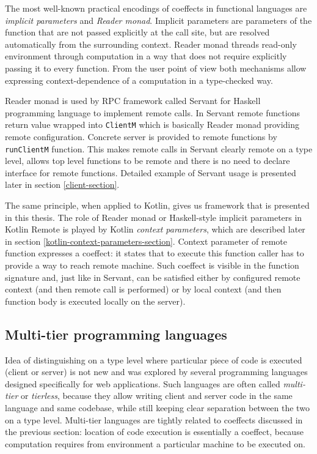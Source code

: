 \documentclass[a4paper,11pt,oneside]{article}
\newcommand{\term}[1]{\textit{#1}}
\begin{document}
The most well-known practical encodings of coeffects in functional languages are \term{implicit
parameters} \cite{lewis_implicit_2000} and \term{Reader monad}. Implicit parameters are parameters
of the function that are not passed explicitly at the call site, but are resolved automatically
from the surrounding context. Reader monad threads read-only environment through computation in a
way that does not require explicitly passing it to every function. From the user point of view both
mechanisms allow expressing context-dependence of a computation in a type-checked way.

Reader monad is used by RPC framework called Servant \cite{noauthor_servant_nodate} for
Haskell programming language to implement remote calls. In Servant remote functions return value
wrapped into \texttt{ClientM} which is basically Reader monad providing remote
configuration. Concrete server is provided to remote functions by
\texttt{runClientM} function. This makes remote calls in Servant clearly remote on a
type level, allows top level functions to be remote and there is no need to declare interface for
remote functions. Detailed example of Servant usage is presented later in section
\ref{client-section}.

The same principle, when applied to Kotlin, gives us framework that is presented in this thesis.
The role of Reader monad or Haskell-style implicit parameters in Kotlin Remote is played by Kotlin
\term{context parameters}, which are described later in section
\ref{kotlin-context-parameters-section}. Context parameter of remote function expresses a coeffect:
it states that to execute this function caller has to provide a way to reach remote machine. Such
coeffect is visible in the function signature and, just like in Servant, can be satisfied either by
configured remote context (and then remote call is performed) or by local context (and then function
body is executed locally on the server).

\subsection{Multi-tier programming languages}\label{multi-tier-section}

Idea of distinguishing on a type level where particular piece of code is executed (client or
server) is not new and was explored by several programming languages designed specifically for
web applications. Such languages are often called \term{multi-tier} or \term{tierless}, because
they allow writing client and server code in the same language and same codebase, while still
keeping clear separation between the two on a type level. Multi-tier languages are tightly related
to coeffects discussed in the previous section: location of code execution is essentially a
coeffect, because computation requires from environment a particular machine to be executed on.
\end{document}
